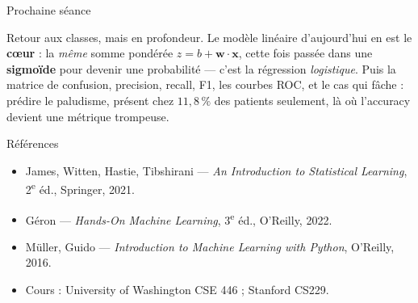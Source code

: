 \documentclass[aspectratio=169,11pt]{beamer}
\begin{document}
\begin{frame}{Prochaine séance}
\begin{ucadfront}
{\small Retour aux classes, mais en profondeur. Le modèle linéaire d'aujourd'hui en est le \textbf{cœur} : la \emph{même} somme pondérée $z = b + \mathbf{w}\cdot\mathbf{x}$, cette fois passée dans une \textbf{sigmoïde} pour devenir une probabilité — c'est la régression \emph{logistique}. Puis la matrice de confusion, precision, recall, F1, les courbes ROC, et le cas qui fâche : prédire le paludisme, présent chez $11{,}8\,\%$ des patients seulement, là où l'accuracy devient une métrique trompeuse.}
\end{ucadfront}
\end{frame}

\begin{frame}{Références}
\begin{itemize}\small
  \item James, Witten, Hastie, Tibshirani — \emph{An Introduction to Statistical Learning}, 2\textsuperscript{e} éd., Springer, 2021.
  \item Géron — \emph{Hands-On Machine Learning}, 3\textsuperscript{e} éd., O'Reilly, 2022.
  \item Müller, Guido — \emph{Introduction to Machine Learning with Python}, O'Reilly, 2016.
  \item Cours : University of Washington CSE 446 ; Stanford CS229.
\end{itemize}
\end{frame}
\end{document}
